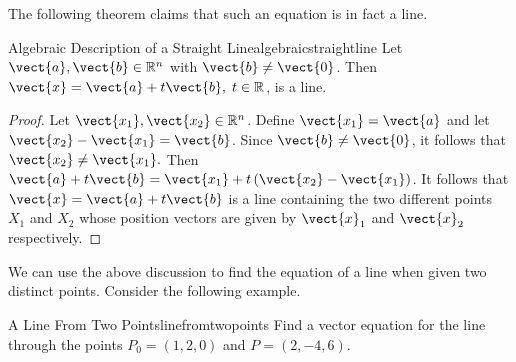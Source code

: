 The following theorem claims that such an equation is in fact a line. 

\begin{proposition}{Algebraic Description of a Straight Line}{algebraicstraightline}
Let $\vect{a},\vect{b}\in \mathbb{R}^{n}$ with $\vect{b}\neq \vect{0}$. 
Then $\vect{x}=\vect{a}+t\vect{b},\; t\in \mathbb{R}$, is a
line.
\end{proposition}

\begin{proof}
Let $\vect{x_{1}}, \vect{x_{2}} \in \mathbb{R}^n$. 
Define $\vect{x_{1}}=\vect{a}$ and let $\vect{x_{2}}-\vect{x_{1}}=\vect{b}$.
Since $\vect{b} \neq \vect{0}$, it follows that $\vect{x_{2}}\neq \vect{x_{1}}.$ Then
$\vect{a}+t\vect{b}=\vect{x_{1}} + t\left( \vect{x_{2}}-\vect{x_{1}}\right) $. It follows that  
$\vect{x}=\vect{a}+t\vect{b}$ is a line containing the two different points 
$X_1$ and $X_2$ whose position vectors are given by $\vect{x}_1$ and $\vect{x}_2$ respectively. 
\end{proof}

We can use the above discussion to find the equation of a line when given two distinct points.
Consider the following example. 

\begin{example}{A Line From Two Points}{linefromtwopoints}
Find a vector equation for the line through the points $P_0 = \left(
1,2,0\right) $ and $P = \left( 2,-4,6\right).$
\end{example}


